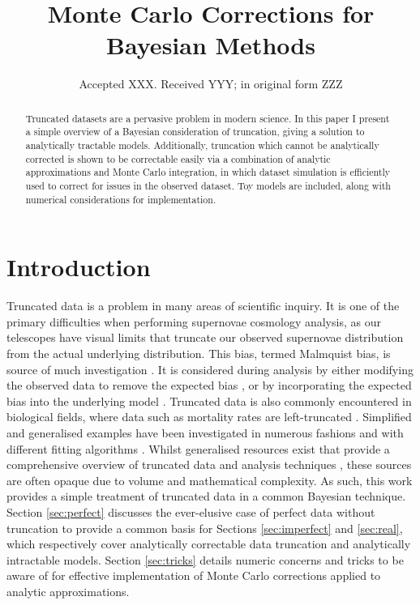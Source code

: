 \documentclass[a4paper,fleqn,usenatbib]{mnras}
\title[MC Corrections for Bayesian Methods]{Monte Carlo Corrections for Bayesian Methods}
\author[S. R. Hinton et al.]{Samuel R. Hinton,$^{1,2}$\thanks{E-mail: \href{samuelreay@gmail.com}}
\\
$^{1}$School of Mathematics and Physics, The University of Queensland, Brisbane, QLD 4072, Australia\\
$^{2}$ARC Centre of Excellence for All-sky Astrophysics (CAASTRO)
}
\date{Accepted XXX. Received YYY; in original form ZZZ}
\begin{document}
\label{firstpage}
\pagerange{\pageref{firstpage}--\pageref{lastpage}}
\maketitle



\begin{abstract}
Truncated datasets are a pervasive problem in modern science. In this paper I present a simple overview of a Bayesian consideration of truncation, giving a solution to analytically tractable models. Additionally, truncation which cannot be analytically corrected is shown to be correctable easily via a combination of analytic approximations and Monte Carlo integration, in which dataset simulation is efficiently used to correct for issues in the observed dataset. Toy models are included, along with numerical considerations for implementation.
\end{abstract}



\section{Introduction}

Truncated data is a problem in many areas of scientific inquiry. It is one of the primary difficulties when performing supernovae cosmology analysis, as our telescopes have visual limits that truncate our observed supernovae distribution from the actual underlying distribution. This bias, termed Malmquist bias, is source of much investigation \citep{Butkevich2005}. It is considered during analysis by either modifying the observed data to remove the expected bias \citep{BetouleKessler2014, ConleyGuySullivan2011}, or by incorporating the expected bias into the underlying model \citep{Rubin2015}. Truncated data is also commonly encountered in biological fields, where data such as mortality rates are left-truncated \citep{JANE1898}. Simplified and generalised examples have been investigated in numerous fashions \citep{woodroofe1985estimating, Gull1989bayesian, grogger1991models, o1995truncated} and with different fitting algorithms \citep{Gelfand1992}. Whilst generalised resources exist that provide a comprehensive overview of truncated data and analysis techniques \citep{klein2005survival}, these sources are often opaque due to volume and mathematical complexity. As such, this work provides a simple treatment of truncated data in a common Bayesian technique. Section \ref{sec:perfect} discusses the ever-elusive case of perfect data without truncation to provide a common basis for Sections \ref{sec:imperfect} and \ref{sec:real}, which respectively cover analytically correctable data truncation and analytically intractable models. Section \ref{sec:tricks} details numeric concerns and tricks to be aware of for effective implementation of Monte Carlo corrections applied to analytic approximations.
\end{document}
